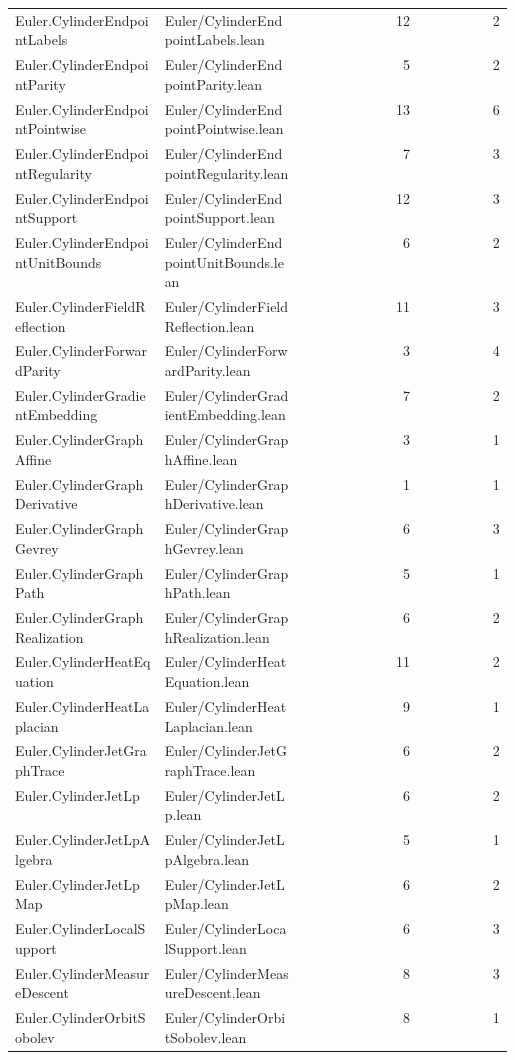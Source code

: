 \begin{longtable}{p{0.30\linewidth}p{0.28\linewidth}rr}
Euler.CylinderEndpointLabels & Euler/CylinderEndpointLabels.lean & 12 & 2\\
Euler.CylinderEndpointParity & Euler/CylinderEndpointParity.lean & 5 & 2\\
Euler.CylinderEndpointPointwise & Euler/CylinderEndpointPointwise.lean & 13 & 6\\
Euler.CylinderEndpointRegularity & Euler/CylinderEndpointRegularity.lean & 7 & 3\\
Euler.CylinderEndpointSupport & Euler/CylinderEndpointSupport.lean & 12 & 3\\
Euler.CylinderEndpointUnitBounds & Euler/CylinderEndpointUnitBounds.lean & 6 & 2\\
Euler.CylinderFieldReflection & Euler/CylinderFieldReflection.lean & 11 & 3\\
Euler.CylinderForwardParity & Euler/CylinderForwardParity.lean & 3 & 4\\
Euler.CylinderGradientEmbedding & Euler/CylinderGradientEmbedding.lean & 7 & 2\\
Euler.CylinderGraphAffine & Euler/CylinderGraphAffine.lean & 3 & 1\\
Euler.CylinderGraphDerivative & Euler/CylinderGraphDerivative.lean & 1 & 1\\
Euler.CylinderGraphGevrey & Euler/CylinderGraphGevrey.lean & 6 & 3\\
Euler.CylinderGraphPath & Euler/CylinderGraphPath.lean & 5 & 1\\
Euler.CylinderGraphRealization & Euler/CylinderGraphRealization.lean & 6 & 2\\
Euler.CylinderHeatEquation & Euler/CylinderHeatEquation.lean & 11 & 2\\
Euler.CylinderHeatLaplacian & Euler/CylinderHeatLaplacian.lean & 9 & 1\\
Euler.CylinderJetGraphTrace & Euler/CylinderJetGraphTrace.lean & 6 & 2\\
Euler.CylinderJetLp & Euler/CylinderJetLp.lean & 6 & 2\\
Euler.CylinderJetLpAlgebra & Euler/CylinderJetLpAlgebra.lean & 5 & 1\\
Euler.CylinderJetLpMap & Euler/CylinderJetLpMap.lean & 6 & 2\\
Euler.CylinderLocalSupport & Euler/CylinderLocalSupport.lean & 6 & 3\\
Euler.CylinderMeasureDescent & Euler/CylinderMeasureDescent.lean & 8 & 3\\
Euler.CylinderOrbitSobolev & Euler/CylinderOrbitSobolev.lean & 8 & 1\\

\end{longtable}

